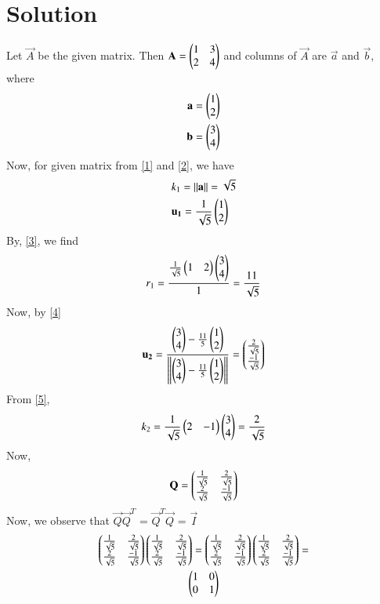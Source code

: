 \documentclass[journal,12pt,twocolumn]{IEEEtran}
\begin{document}
\section{Solution}
Let $\vec{A}$ be the given matrix. Then $\mathbf{A} = \begin{pmatrix}1 & 3 \\ 2 & 4\end{pmatrix}$ and columns of $\vec{A}$ are $\vec{a}$ and $\vec{b}$, where
\begin{align}
	\mathbf{a} = \begin{pmatrix} 1 \\ 2\end{pmatrix} \\
	\mathbf{b} = \begin{pmatrix} 3 \\ 4\end{pmatrix}
\end{align}
Now, for given matrix from \eqref{1} and \eqref{2}, we have
\begin{align}
&	k_1 = \left\lVert\mathbf{a}\right\rVert = \sqrt{5} \\
&	\mathbf{u_1} = \frac{1}{\sqrt{5}}\begin{pmatrix}1 \\ 2\end{pmatrix}
\end{align}
By, \eqref{3}, we find
\begin{align}
	r_1 = \frac{\frac{1}{\sqrt{5}}\begin{pmatrix}1 & 2\end{pmatrix}\begin{pmatrix}3 \\ 4\end{pmatrix}}{1} =\frac{11}{\sqrt{5}}
\end{align}
Now, by \eqref{4}
\begin{align}
	\mathbf{u_2} = \frac{\begin{pmatrix}3 \\ 4\end{pmatrix}- \frac{11}{5}\begin{pmatrix}1 \\2\end{pmatrix}}{\left\lVert\begin{pmatrix}3 \\ 4\end{pmatrix}- \frac{11}{5}\begin{pmatrix}1 \\2\end{pmatrix}\right\rVert} = \begin{pmatrix}\frac{2}{\sqrt{5}} \\ \frac{-1}{\sqrt{5}}\end{pmatrix}
\end{align}
From \eqref{5},
\begin{align}
	k_2 = \frac{1}{\sqrt{5}}\begin{pmatrix}2 & -1\end{pmatrix}\begin{pmatrix}3 \\ 4\end{pmatrix} = \frac{2}{\sqrt{5}}
\end{align}
Now,
\begin{align}
	\mathbf{Q} = \begin{pmatrix}\frac{1}{\sqrt{5}} & \frac{2}{\sqrt{5}} \\ \frac{2}{\sqrt{5}} & \frac{-1}{\sqrt{5}} \end{pmatrix} 
\end{align}
Now, we observe that $\vec{Q}$$\vec{Q}^T$ = $\vec{Q}^T$$\vec{Q}$ = $\vec{I}$
\begin{multline}
	\begin{pmatrix}\frac{1}{\sqrt{5}} & \frac{2}{\sqrt{5}} \\ \frac{2}{\sqrt{5}} & \frac{-1}{\sqrt{5}}\end{pmatrix} \begin{pmatrix}\frac{1}{\sqrt{5}} & \frac{2}{\sqrt{5}} \\ \frac{2}{\sqrt{5}} & \frac{-1}{\sqrt{5}}\end{pmatrix} = \begin{pmatrix}\frac{1}{\sqrt{5}} & \frac{2}{\sqrt{5}} \\ \frac{2}{\sqrt{5}} & \frac{-1}{\sqrt{5}}\end{pmatrix} \begin{pmatrix}\frac{1}{\sqrt{5}} & \frac{2}{\sqrt{5}} \\ \frac{2}{\sqrt{5}} & \frac{-1}{\sqrt{5}}\end{pmatrix} = \\ 
	\begin{pmatrix}1 & 0 \\ 0 & 1\end{pmatrix}
\end{multline}
\end{document}
